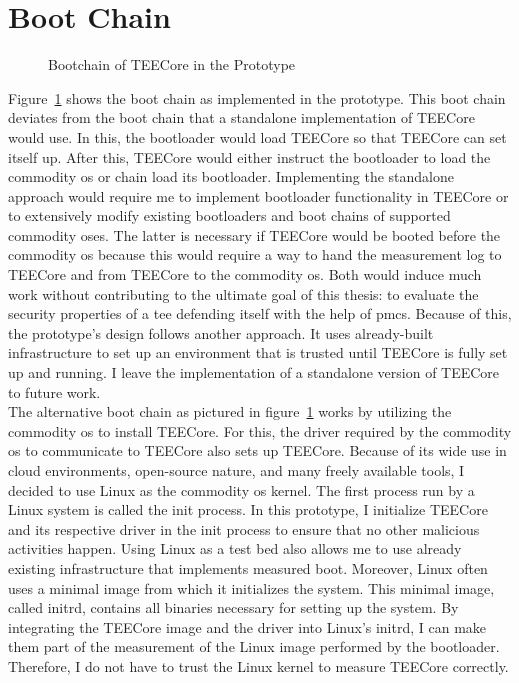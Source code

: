 \section{Boot Chain}
\label{sec:30:tee_boot_chain}
\begin{figure}
  \begin{center}
    
    \caption{Bootchain of TEECore in the Prototype}
    \label{fig:30:tee_bootchain}
  \end{center}
\end{figure}
Figure~\ref{fig:30:tee_bootchain} shows the boot chain as implemented in the
prototype. This boot chain deviates from the boot chain that a standalone
implementation of TEECore would use. In this, the bootloader would load TEECore
so that TEECore can set itself up. After this, TEECore would either instruct the
bootloader to load the commodity \gls{os} or chain load its bootloader.
Implementing the standalone approach would require me to implement bootloader
functionality in TEECore or to extensively modify existing bootloaders and boot
chains of supported commodity \gls{os}es. The latter is necessary if TEECore
would be booted before the commodity \gls{os} because this would require a way
to hand the measurement log to TEECore and from TEECore to the commodity
\gls{os}. Both would induce much work without contributing to the ultimate goal
of this thesis: to evaluate the security properties of a \gls{tee} defending
itself with the help of \glspl{pmc}. Because of this, the prototype's design
follows another approach. It uses already-built infrastructure to set up an
environment that is trusted until TEECore is fully set up and running. I leave
the implementation of a standalone version of TEECore to future work.\\

The alternative boot chain as pictured in figure~\ref{fig:30:tee_bootchain}
works by utilizing the commodity \gls{os} to install TEECore. For this, the
driver required by the commodity \gls{os} to communicate to TEECore also sets up
TEECore. Because of its wide use in cloud environments, open-source nature, and
many freely available tools, I decided to use Linux as the commodity \gls{os}
kernel. The first process run by a Linux system is called the init process. In
this prototype, I initialize TEECore and its respective driver in the init
process to ensure that no other malicious activities happen. Using Linux as a
test bed also allows me to use already existing infrastructure that implements
measured boot. Moreover, Linux often uses a minimal image from which it
initializes the system. This minimal image, called initrd, contains all binaries
necessary for setting up the system. By integrating the TEECore image and the
driver into Linux's initrd, I can make them part of the measurement of the Linux
image performed by the bootloader. Therefore, I do not have to trust the Linux
kernel to measure TEECore correctly. \\

